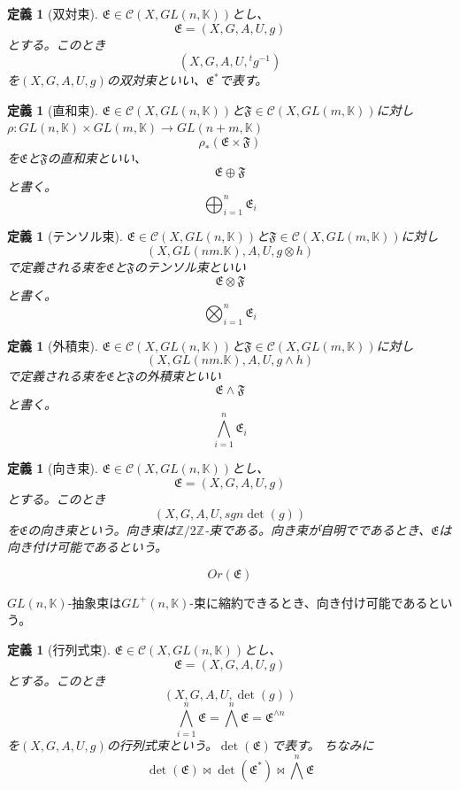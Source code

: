 \documentclass[leqno]{jsarticle}
\newtheorem{df}[thm]{定義}
\newcommand{\zz}{\mathbb{Z}}
\begin{document}
\begin{df}[双対束]
$\mathfrak{E}\in \mathscr{C}(X, GL(n,\mathbb{K}))$とし、
\[
\mathfrak{E}=(X, G, A, U, g)
\]
とする。このとき
\[
(X, G, A, U, {}^tg^{-1})
\]
を$(X, G, A, U, g)$の双対束といい、$\mathfrak{E}^{*}$で表す。
\end{df}
\begin{df}[直和束]
$\mathfrak{E}\in \mathscr{C}(X, GL(n,\mathbb{K}))$と$\mathfrak{F}\in \mathscr{C}(X, GL(m,\mathbb{K}))$に対し
$\rho:GL(n,\mathbb{K})\times GL(m, \mathbb{K})\to GL(n+m, \mathbb{K})$
\[
\rho_{*}(\mathfrak{E}\times \mathfrak{F})
\]
を$\mathfrak{E}$と$\mathfrak{F}$の直和束といい、
\[
\mathfrak{E}\oplus \mathfrak{F}
\]
と書く。
\[
\bigoplus_{i=1}^n\mathfrak{E}_i
\]
\end{df}
\begin{df}[テンソル束]
$\mathfrak{E}\in \mathscr{C}(X, GL(n,\mathbb{K}))$と$\mathfrak{F}\in \mathscr{C}(X, GL(m,\mathbb{K}))$に対し
\[
(X, GL(nm. \mathbb{K}), A, U, g\otimes h)
\]
で定義される束を$\mathfrak{E}$と$\mathfrak{F}$のテンソル束といい
\[
\mathfrak{E}\otimes \mathfrak{F}
\]
と書く。
\[
\bigotimes_{i=1}^n\mathfrak{E}_i
\]
\end{df}

\begin{df}[外積束]
$\mathfrak{E}\in \mathscr{C}(X, GL(n,\mathbb{K}))$と$\mathfrak{F}\in \mathscr{C}(X, GL(m,\mathbb{K}))$に対し
\[
(X, GL(nm. \mathbb{K}), A, U, g\wedge h)
\]
で定義される束を$\mathfrak{E}$と$\mathfrak{F}$の外積束といい
\[
\mathfrak{E}\wedge \mathfrak{F}
\]
と書く。
\[
\bigwedge_{i=1}^n\mathfrak{E}_i
\]
\end{df}

\begin{df}[向き束]
$\mathfrak{E}\in \mathscr{C}(X, GL(n,\mathbb{K}))$とし、
\[
\mathfrak{E}=(X, G, A, U, g)
\]
とする。このとき
\[
(X, G, A, U, sgn\det(g))
\]
を$\mathfrak{E}$の向き束という。向き束は$\zz/2\zz$-束である。向き束が自明でであるとき、$\mathfrak{E}$は向き付け可能であるという。

\[
Or(\mathfrak{E})
\]

\end{df}
$GL(n,\mathbb{K})$-抽象束は$GL^+(n, \mathbb{K})$-束に縮約できるとき、向き付け可能であるという。


\begin{df}[行列式束]
$\mathfrak{E}\in \mathscr{C}(X, GL(n,\mathbb{K}))$とし、
\[
\mathfrak{E}=(X, G, A, U, g)
\]
とする。このとき
\[
(X, G, A, U, \det(g))
\]
\[
\bigwedge_{i=1}^n\mathfrak{E}=\bigwedge^n\mathfrak{E}=\mathfrak{E}^{\wedge n}
\]
を$(X, G, A, U, g)$の行列式束という。$\det(\mathfrak{E})$で表す。
ちなみに
\[
\det(\mathfrak{E})\bowtie \det(\mathfrak{E}^{*})\bowtie \bigwedge^n\mathfrak{E}
\]
\end{df}
\end{document}
